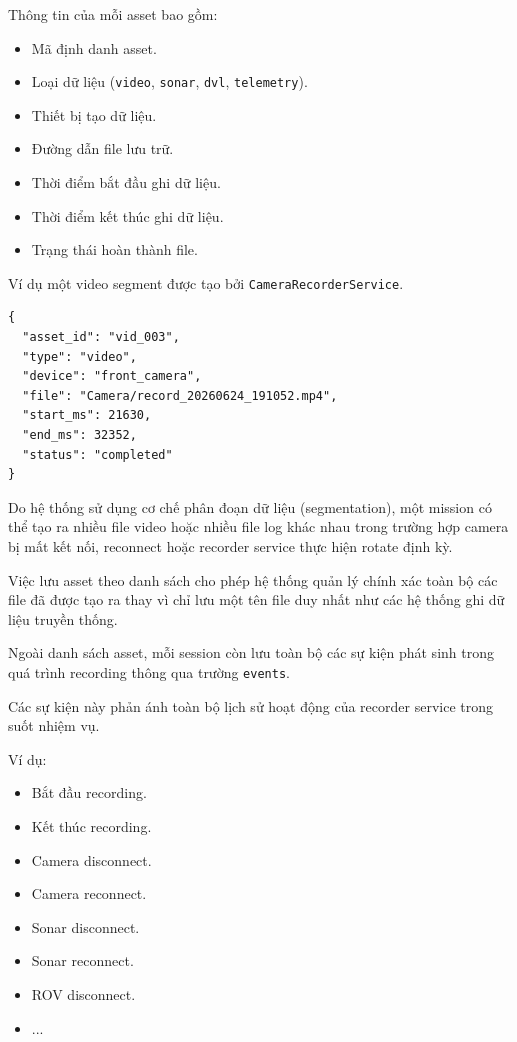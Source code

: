 \documentclass[../DoAn.tex]{subfiles}
\begin{document}
Thông tin của mỗi asset bao gồm:

\begin{itemize}
    \item Mã định danh asset.
    \item Loại dữ liệu (\texttt{video}, \texttt{sonar}, \texttt{dvl}, \texttt{telemetry}).
    \item Thiết bị tạo dữ liệu.
    \item Đường dẫn file lưu trữ.
    \item Thời điểm bắt đầu ghi dữ liệu.
    \item Thời điểm kết thúc ghi dữ liệu.
    \item Trạng thái hoàn thành file.
\end{itemize}

Ví dụ một video segment được tạo bởi \texttt{CameraRecorderService}.

\begin{verbatim}
{
  "asset_id": "vid_003",
  "type": "video",
  "device": "front_camera",
  "file": "Camera/record_20260624_191052.mp4",
  "start_ms": 21630,
  "end_ms": 32352,
  "status": "completed"
}
\end{verbatim}

Do hệ thống sử dụng cơ chế phân đoạn dữ liệu (segmentation), một mission có thể tạo ra nhiều file video hoặc nhiều file log khác nhau trong trường hợp camera bị mất kết nối, reconnect hoặc recorder service thực hiện rotate định kỳ.

Việc lưu asset theo danh sách cho phép hệ thống quản lý chính xác toàn bộ các file đã được tạo ra thay vì chỉ lưu một tên file duy nhất như các hệ thống ghi dữ liệu truyền thống.

Ngoài danh sách asset, mỗi session còn lưu toàn bộ các sự kiện phát sinh trong quá trình recording thông qua trường \texttt{events}.

Các sự kiện này phản ánh toàn bộ lịch sử hoạt động của recorder service trong suốt nhiệm vụ.

Ví dụ:

\begin{itemize}
    \item Bắt đầu recording.
    \item Kết thúc recording.
    \item Camera disconnect.
    \item Camera reconnect.
    \item Sonar disconnect.
    \item Sonar reconnect.
    \item ROV disconnect.
    \item ...
\end{itemize}
\end{document}

